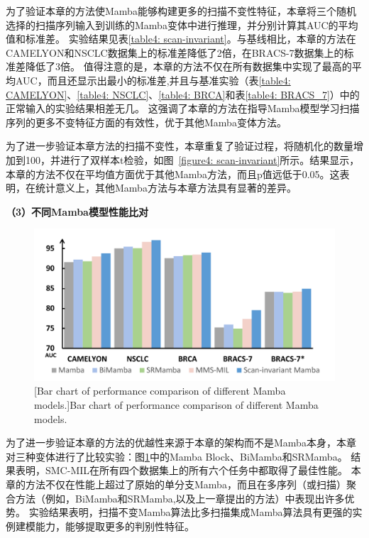 为了验证本章的方法使Mamba能够构建更多的扫描不变性特征，本章将三个随机选择的扫描序列输入到训练的Mamba变体中进行推理，并分别计算其AUC的平均值和标准差。
实验结果见表\ref{table4: scan-invariant}。与基线相比，本章的方法在CAMELYON和NSCLC数据集上的标准差降低了2倍，在BRACS-7数据集上的标准差降低了3倍。
值得注意的是，本章的方法不仅在所有数据集中实现了最高的平均AUC，而且还显示出最小的标准差,并且与基准实验（表\ref{table4: CAMELYON}、\ref{table4: NSCLC}、\ref{table4: BRCA}和表\ref{table4: BRACS_7}）中的正常输入的实验结果相差无几。
这强调了本章的方法在指导Mamba模型学习扫描序列的更多不变特征方面的有效性，优于其他Mamba变体方法。

为了进一步验证本章方法的扫描不变性，本章重复了验证过程，将随机化的数量增加到100，并进行了双样本t检验，如图~\ref{figure4: scan-invariant}所示。结果显示，本章的方法不仅在平均值方面优于其他Mamba方法，而且p值远低于0.05。这表明，在统计意义上，其他Mamba方法与本章方法具有显著的差异。

\textbf{（3）不同Mamba模型性能比对}

\begin{figure}[h!]
  \centering
  \includegraphics[width=0.9\columnwidth]{figures/SMCMIL的不同Mamba比较.pdf}
  [Bar chart of performance comparison of different Mamba models.]{Bar chart of performance comparison of different Mamba models.}
  \label{figure4: DifferentMamba}
\end{figure}

为了进一步验证本章的方法的优越性来源于本章的架构而不是Mamba本身，本章对三种变体进行了比较实验：图\ref{figure4: DifferentMamba}中的Mamba Block、BiMamba和SRMamba。
结果表明，SMC-MIL在所有四个数据集上的所有六个任务中都取得了最佳性能。
本章的方法不仅在性能上超过了原始的单分支Mamba，而且在多序列（或扫描）聚合方法（例如，BiMamba和SRMamba,以及上一章提出的方法）中表现出许多优势。
实验结果表明，扫描不变Mamba算法比多扫描集成Mamba算法具有更强的实例建模能力，能够提取更多的判别性特征。


